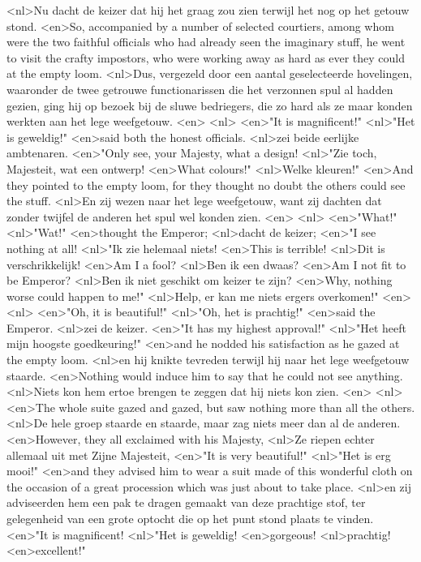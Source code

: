 <nl>Nu dacht de keizer dat hij het graag zou zien terwijl het nog op het getouw stond.
<en>So, accompanied by a number of selected courtiers, among whom were the two faithful officials who had already seen the imaginary stuff, he went to visit the crafty impostors, who were working away as hard as ever they could at the empty loom.
<nl>Dus, vergezeld door een aantal geselecteerde hovelingen, waaronder de twee getrouwe functionarissen die het verzonnen spul al hadden gezien, ging hij op bezoek bij de sluwe bedriegers, die zo hard als ze maar konden werkten aan het lege weefgetouw.
<en>
<nl>
<en>"It is magnificent!"
<nl>"Het is geweldig!"
<en>said both the honest officials.
<nl>zei beide eerlijke ambtenaren.
<en>"Only see, your Majesty, what a design!
<nl>"Zie toch, Majesteit, wat een ontwerp!
<en>What colours!"
<nl>Welke kleuren!"
<en>And they pointed to the empty loom, for they thought no doubt the others could see the stuff.
<nl>En zij wezen naar het lege weefgetouw, want zij dachten  dat zonder twijfel de anderen het spul wel konden zien.
<en>
<nl>
<en>"What!"
<nl>"Wat!"
<en>thought the Emperor;
<nl>dacht de keizer;
<en>"I see nothing at all!
<nl>"Ik zie helemaal niets!
<en>This is terrible!
<nl>Dit is verschrikkelijk!
<en>Am I a fool?
<nl>Ben ik een dwaas?
<en>Am I not fit to be Emperor?
<nl>Ben ik niet geschikt om keizer te zijn?
<en>Why, nothing worse could happen to me!"
<nl>Help, er kan me niets ergers overkomen!"
<en>
<nl>
<en>"Oh, it is beautiful!"
<nl>"Oh, het is prachtig!"
<en>said the Emperor.
<nl>zei de keizer.
<en>"It has my highest approval!"
<nl>"Het heeft mijn hoogste goedkeuring!"
<en>and he nodded his satisfaction as he gazed at the empty loom.
<nl>en hij knikte tevreden terwijl hij naar het lege weefgetouw staarde.
<en>Nothing would induce him to say that he could not see anything.
<nl>Niets kon hem ertoe brengen te zeggen dat hij niets kon zien.
<en>
<nl>
<en>The whole suite gazed and gazed, but saw nothing more than all the others.
<nl>De hele groep staarde en staarde, maar zag niets meer dan al de anderen.
<en>However, they all exclaimed with his Majesty,
<nl>Ze riepen echter allemaal uit met Zijne Majesteit,
<en>"It is very beautiful!"
<nl>"Het is erg mooi!"
<en>and they advised him to wear a suit made of this wonderful cloth on the occasion of a great procession which was just about to take place.
<nl>en zij adviseerden hem een pak te dragen gemaakt  van deze prachtige stof, ter gelegenheid van een grote optocht die op het punt stond plaats te vinden.
<en>"It is magnificent!
<nl>"Het is geweldig!
<en>gorgeous!
<nl>prachtig!
<en>excellent!"
